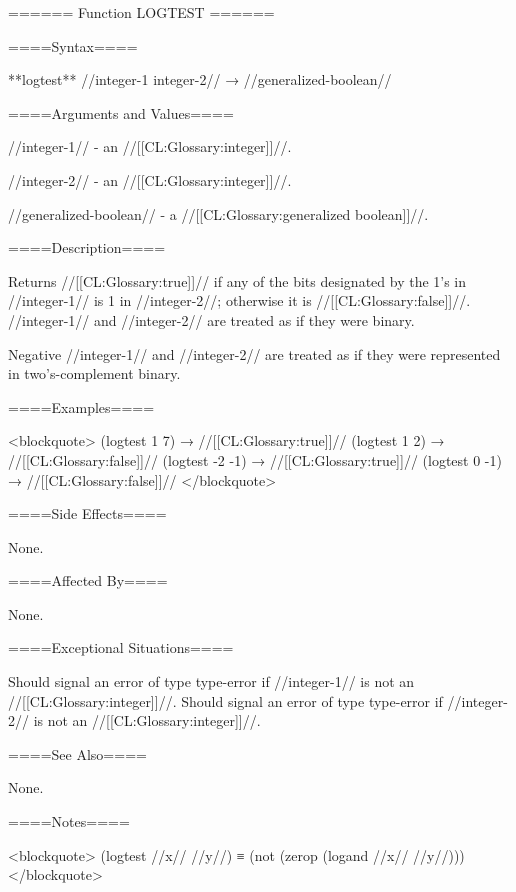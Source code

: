 ====== Function LOGTEST ======

====Syntax====

**logtest** //integer-1 integer-2// → //generalized-boolean//

====Arguments and Values====

//integer-1// - an //[[CL:Glossary:integer]]//.

//integer-2// - an //[[CL:Glossary:integer]]//.

//generalized-boolean// - a //[[CL:Glossary:generalized boolean]]//.

====Description====

Returns //[[CL:Glossary:true]]// if any of the bits designated by the 1's in //integer-1// is 1 in //integer-2//; otherwise it is //[[CL:Glossary:false]]//. //integer-1// and //integer-2// are treated as if they were binary.

Negative //integer-1// and //integer-2// are treated as if they were represented in two's-complement binary.

====Examples====

<blockquote> (logtest 1 7) → //[[CL:Glossary:true]]// (logtest 1 2) → //[[CL:Glossary:false]]// (logtest -2 -1) → //[[CL:Glossary:true]]// (logtest 0 -1) → //[[CL:Glossary:false]]// </blockquote>

====Side Effects====

None.

====Affected By====

None.

====Exceptional Situations====

Should signal an error of type type-error if //integer-1// is not an //[[CL:Glossary:integer]]//. Should signal an error of type type-error if //integer-2// is not an //[[CL:Glossary:integer]]//.

====See Also====

None.

====Notes====

<blockquote> (logtest //x// //y//) ≡ (not (zerop (logand //x// //y//))) </blockquote>

